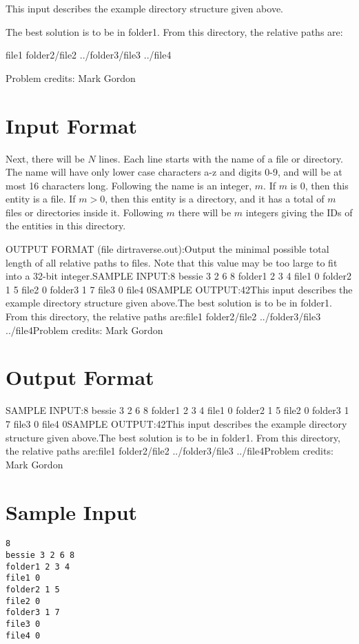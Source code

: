 \documentclass[12pt]{article}
\begin{document}
This input describes the example directory structure given above.

The best solution is to be in folder1. From this directory, the relative paths
are:


file1
folder2/file2
../folder3/file3
../file4


Problem credits: Mark Gordon



\section*{Input Format}
Next, there will be $N$ lines. Each line  starts with the name of a file or
directory. The name will have only lower case characters a-z and digits 0-9, and
will be at most 16 characters long. Following the name is an integer, $m$. If
$m$ is 0, then this entity is a file. If $m > 0$, then this entity is a
directory, and it has a total of $m$ files or directories inside it.  Following $m$
there will be $m$ integers giving the IDs of the entities in this directory.

OUTPUT FORMAT (file dirtraverse.out):Output the minimal possible total length of all relative paths to files. Note
that this value may be too large to fit into a 32-bit integer.SAMPLE INPUT:8
bessie 3 2 6 8
folder1 2 3 4
file1 0
folder2 1 5
file2 0
folder3 1 7
file3 0
file4 0SAMPLE OUTPUT:42This input describes the example directory structure given above.The best solution is to be in folder1. From this directory, the relative paths
are:file1
folder2/file2
../folder3/file3
../file4Problem credits: Mark Gordon

\section*{Output Format}
SAMPLE INPUT:8
bessie 3 2 6 8
folder1 2 3 4
file1 0
folder2 1 5
file2 0
folder3 1 7
file3 0
file4 0SAMPLE OUTPUT:42This input describes the example directory structure given above.The best solution is to be in folder1. From this directory, the relative paths
are:file1
folder2/file2
../folder3/file3
../file4Problem credits: Mark Gordon

\section*{Sample Input}
\begin{verbatim}
8
bessie 3 2 6 8
folder1 2 3 4
file1 0
folder2 1 5
file2 0
folder3 1 7
file3 0
file4 0
\end{verbatim}
\end{document}
